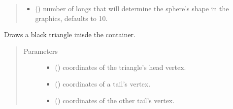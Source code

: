 \documentclass[a4paper,11pt,oneside,english]{sphinxmanual}
\begin{document}
\begin{fulllineitems}
\begin{quote}
\begin{description}
\begin{itemize}
\item {} 
 (\sphinxstyleliteralemphasis{\sphinxupquote{, }}) \textendash{} number of longs that will determine the sphere’s shape in the graphics, defaults to 10.

\end{itemize}

\end{description}\end{quote}

\bigskip 
\bigskip 

\end{fulllineitems}


\begin{fulllineitems}
\label{\detokenize{graphics:graphics.draw_triangle}}
Draws a black triangle inisde the container.
\begin{quote}\begin{description}
\item[{Parameters}] \leavevmode\begin{itemize}
\item {} 
 () \textendash{} coordinates of the triangle’s head vertex.

\item {} 
 () \textendash{} coordinates of a tail’s vertex.

\item {} 
 () \textendash{} coordinates of the other tail’s vertex.

\end{itemize}

\end{description}\end{quote}

\bigskip 
\bigskip 

\end{fulllineitems}
\end{document}
